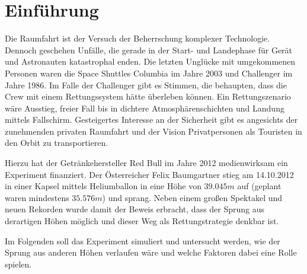 \newpage

\section{Einführung}

Die Raumfahrt ist der Versuch der Beherrschung komplexer Technologie.
Dennoch geschehen Unfälle, die gerade in der Start- und Landephase für Gerät und Astronauten katastrophal enden.
Die letzten Unglücke mit umgekommenen Personen waren die Space Shuttles Columbia im Jahre 2003 und Challenger im Jahre 1986.
Im Falle der Challenger gibt es Stimmen, die behaupten, dass die Crew mit einem Rettungssystem hätte überleben können.
Ein Rettungszenario wäre Ausstieg, freier Fall bis in dichtere Atmosphärenschichten und Landung mittels Fallschirm.
Gesteigertes Interesse an der Sicherheit gibt es angesichts der zunehmenden privaten Raumfahrt und der Vision Privatpersonen als Touristen in den Orbit zu transportieren.

Hierzu hat der Getränkehersteller Red Bull im Jahre 2012 medienwirksam ein Experiment finanziert.
Der Österreicher Felix Baumgartner stieg am 14.10.2012 in einer Kapsel mittels Heliumballon in eine Höhe von $39.045m$ auf (geplant waren mindestens $35.576m$) und sprang.
Neben einem großen Spektakel und neuen Rekorden wurde damit der Beweis erbracht, dass der Sprung aus derartigen Höhen möglich und dieser Weg als Rettungstrategie denkbar ist.

Im Folgenden soll das Experiment simuliert und untersucht werden, wie der Sprung aus anderen Höhen verlaufen wäre und welche Faktoren dabei eine Rolle spielen.

